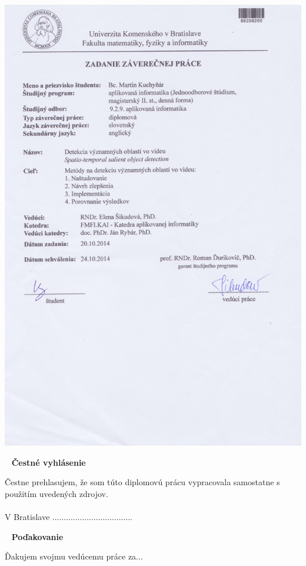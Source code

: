 \newpage
\thispagestyle{empty}
\vspace*{-35px}\hspace*{-30px}
\includegraphics[scale=0.2]{pics/zadanie.jpeg}

\newpage
{~}\vfill
{\noindent \large\bf Čestné vyhlásenie} 
\vspace{1.5cm}

Čestne prehlasujem, že som túto diplomovú prácu vypracovala samostatne s použitím uvedených zdrojov.\\\\ 
V Bratislave
\hfill ................................... 
\vspace{1cm}

\newpage
{~}\vfill
{\noindent\large\bf Poďakovanie} 
\vspace{1.5cm}

Ďakujem svojmu vedúcemu práce za...  \\
\vspace{1cm}

\newpage

